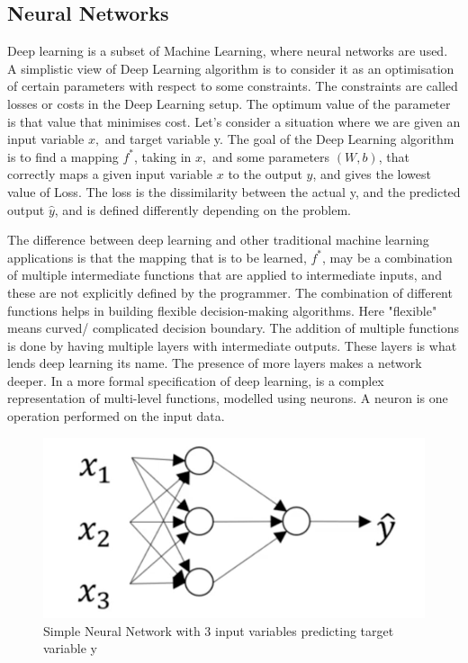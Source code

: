 \subsection{Neural Networks}
Deep learning is a subset of Machine Learning, where neural networks are used. 
A simplistic view of Deep Learning algorithm is to consider it as an optimisation of certain parameters with respect to some constraints. The constraints are called losses or costs in the Deep Learning setup. The optimum value of the parameter is that value that minimises cost. Let's consider a situation where we are given an input variable \(x, \) and target variable y. The goal of the Deep Learning algorithm is to find a mapping \(f^*\), taking in \(x, \) and some parameters \((W, b)\), that correctly maps a given input variable \(x \) to the output \(y \), and gives the lowest value of Loss. The loss is the dissimilarity between the actual y, and the predicted output \(\hat{y}\), and is defined differently depending on the problem.

The difference between deep learning and other traditional machine learning applications is that the mapping that is to be learned, \( f^* \), may be a combination of multiple intermediate functions that are applied to intermediate inputs, and these are not explicitly defined by the programmer. The combination of different functions helps in building flexible decision-making algorithms. Here "flexible" means curved/ complicated decision boundary. The addition of multiple functions is done by having multiple layers with intermediate outputs. These layers is what lends deep learning its name. The presence of more layers makes a network deeper.
In a more formal specification of deep learning, is a complex representation of multi-level functions, modelled using neurons. A neuron is one operation performed on the input data. 


\begin{figure}
    \centering
    \includegraphics[height=0.15\paperheight]{Figures/nn_simple.png}
    \caption[A basic Neural Network diagram]{Simple Neural Network with 3 input variables predicting target variable y
    \cite{noauthor_neural_nodate}}
    \label{fig:NN_diagram}
\end{figure}

